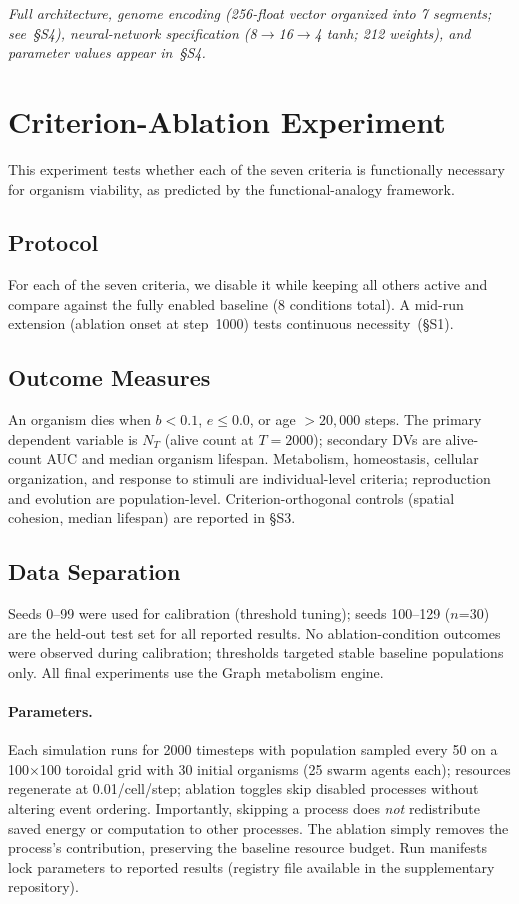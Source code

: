 \documentclass[letterpaper]{article}
\begin{document}
\textit{Full architecture, genome encoding (256-float vector organized into 7 segments; see~§S4), neural-network specification (8$\to$16$\to$4 tanh; 212 weights), and parameter values appear in~§S4.}

\section{Criterion-Ablation Experiment}

This experiment tests whether each of the seven criteria is functionally
necessary for organism viability, as predicted by the functional-analogy
framework.

\subsection{Protocol}

For each of the seven criteria, we disable it while keeping all others active
and compare against the fully enabled baseline (8 conditions total). A mid-run
extension (ablation onset at step~1000) tests continuous necessity~(§S1).

\subsection{Outcome Measures}

An organism dies when $b < 0.1$, $e \leq 0.0$, or age $>20{,}000$ steps.
The primary dependent variable is $N_T$ (alive count at $T{=}2000$); secondary
DVs are alive-count AUC and median organism lifespan.
Metabolism, homeostasis, cellular organization, and response to stimuli are
individual-level criteria; reproduction and evolution are population-level.
Criterion-orthogonal controls (spatial cohesion, median lifespan) are
reported in §S3.

\subsection{Data Separation}

Seeds 0--99 were used for calibration (threshold tuning); seeds 100--129
($n$=30) are the held-out test set for all reported results.
No ablation-condition outcomes were observed during calibration; thresholds
targeted stable baseline populations only. All final experiments use the
Graph metabolism engine.

\paragraph{Parameters.}
Each simulation runs for 2000 timesteps with population sampled every 50
on a 100$\times$100
toroidal grid with 30 initial organisms (25 swarm agents each); resources
regenerate at 0.01/cell/step; ablation toggles skip disabled processes
without altering event ordering.
Importantly, skipping a process does \emph{not} redistribute saved energy
or computation to other processes. The ablation simply removes the process's
contribution, preserving the baseline resource budget. Run manifests lock parameters to reported results
(registry file available in the supplementary repository).
\end{document}
